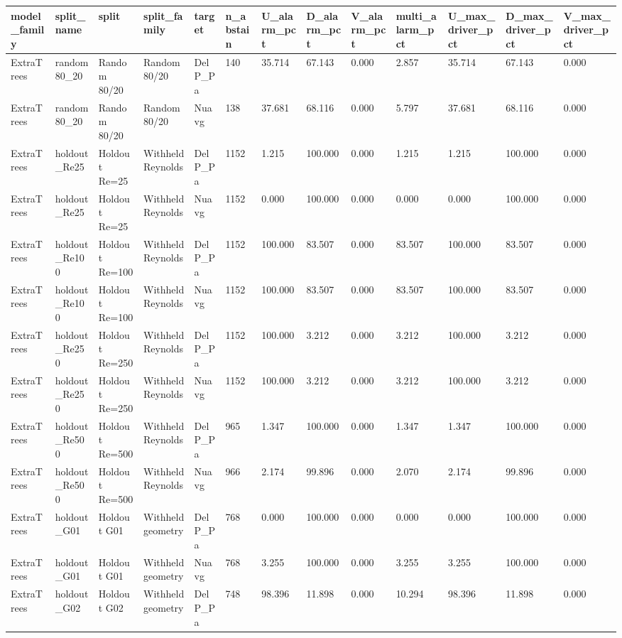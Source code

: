 \begin{tabular}{lllllllllllll}
\hline
model_family & split_name & split & split_family & target & n_abstain & U_alarm_pct & D_alarm_pct & V_alarm_pct & multi_alarm_pct & U_max_driver_pct & D_max_driver_pct & V_max_driver_pct \\
\hline
ExtraTrees & random80_20 & Random 80/20 & Random 80/20 & DelP_Pa & 140 & 35.714 & 67.143 & 0.000 & 2.857 & 35.714 & 67.143 & 0.000 \\
ExtraTrees & random80_20 & Random 80/20 & Random 80/20 & Nuavg & 138 & 37.681 & 68.116 & 0.000 & 5.797 & 37.681 & 68.116 & 0.000 \\
ExtraTrees & holdout_Re25 & Holdout Re=25 & Withheld Reynolds & DelP_Pa & 1152 & 1.215 & 100.000 & 0.000 & 1.215 & 1.215 & 100.000 & 0.000 \\
ExtraTrees & holdout_Re25 & Holdout Re=25 & Withheld Reynolds & Nuavg & 1152 & 0.000 & 100.000 & 0.000 & 0.000 & 0.000 & 100.000 & 0.000 \\
ExtraTrees & holdout_Re100 & Holdout Re=100 & Withheld Reynolds & DelP_Pa & 1152 & 100.000 & 83.507 & 0.000 & 83.507 & 100.000 & 83.507 & 0.000 \\
ExtraTrees & holdout_Re100 & Holdout Re=100 & Withheld Reynolds & Nuavg & 1152 & 100.000 & 83.507 & 0.000 & 83.507 & 100.000 & 83.507 & 0.000 \\
ExtraTrees & holdout_Re250 & Holdout Re=250 & Withheld Reynolds & DelP_Pa & 1152 & 100.000 & 3.212 & 0.000 & 3.212 & 100.000 & 3.212 & 0.000 \\
ExtraTrees & holdout_Re250 & Holdout Re=250 & Withheld Reynolds & Nuavg & 1152 & 100.000 & 3.212 & 0.000 & 3.212 & 100.000 & 3.212 & 0.000 \\
ExtraTrees & holdout_Re500 & Holdout Re=500 & Withheld Reynolds & DelP_Pa & 965 & 1.347 & 100.000 & 0.000 & 1.347 & 1.347 & 100.000 & 0.000 \\
ExtraTrees & holdout_Re500 & Holdout Re=500 & Withheld Reynolds & Nuavg & 966 & 2.174 & 99.896 & 0.000 & 2.070 & 2.174 & 99.896 & 0.000 \\
ExtraTrees & holdout_G01 & Holdout G01 & Withheld geometry & DelP_Pa & 768 & 0.000 & 100.000 & 0.000 & 0.000 & 0.000 & 100.000 & 0.000 \\
ExtraTrees & holdout_G01 & Holdout G01 & Withheld geometry & Nuavg & 768 & 3.255 & 100.000 & 0.000 & 3.255 & 3.255 & 100.000 & 0.000 \\
ExtraTrees & holdout_G02 & Holdout G02 & Withheld geometry & DelP_Pa & 748 & 98.396 & 11.898 & 0.000 & 10.294 & 98.396 & 11.898 & 0.000 \\

\end{tabular}
